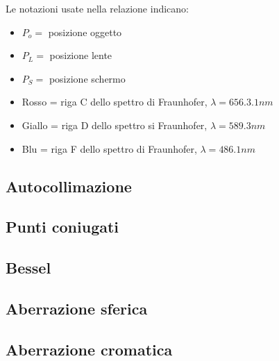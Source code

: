 Le notazioni usate nella relazione indicano:
\begin{itemize}
\item $P_o =$ posizione oggetto
\item $P_L =$ posizione lente
\item $P_S =$ posizione schermo
\item Rosso = riga C dello spettro di Fraunhofer, $\lambda = 656.3.1 nm$
\item Giallo = riga D dello spettro si Fraunhofer, $\lambda = 589.3 nm$
\item Blu = riga F dello spettro di Fraunhofer, $\lambda = 486.1 nm$
\end{itemize}
\FloatBarrier
\subsection{Autocollimazione}

\FloatBarrier
\subsection{Punti coniugati}

\FloatBarrier
\subsection{Bessel}

\FloatBarrier
\subsection{Aberrazione sferica}

\FloatBarrier
\subsection{Aberrazione cromatica}

